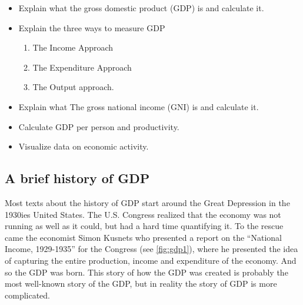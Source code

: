 \documentclass[]{book}
\providecommand{\tightlist}{%
  \setlength{\itemsep}{0pt}\setlength{\parskip}{0pt}}
\begin{document}
\begin{itemize}
\tightlist
\item
  Explain what the gross domestic product (GDP) is and calculate it.
\item
  Explain the three ways to measure GDP

  \begin{enumerate}
  \def\labelenumi{\arabic{enumi}.}
  \tightlist
  \item
    The Income Approach
  \item
    The Expenditure Approach
  \item
    The Output approach.
  \end{enumerate}
\item
  Explain what The gross national income (GNI) is and calculate it.
\item
  Calculate GDP per person and productivity.
\item
  Visualize data on economic activity.
\end{itemize}

\hypertarget{a-brief-history-of-gdp}{%
\subsection{A brief history of GDP}\label{a-brief-history-of-gdp}}

Most texts about the history of GDP start around the Great Depression in the 1930ies United States. The U.S. Congress realized that the economy was not running as well as it could, but had a hard time quantifying it. To the rescue came the economist Simon Kusnets who presented a report on the ``National Income, 1929-1935'' for the Congress (see \ref{fig:gdp1}), where he presented the idea of capturing the entire production, income and expenditure of the economy. And so the GDP was born. This story of how the GDP was created is probably the most well-known story of the GDP, but in reality the story of GDP is more complicated.
\end{document}
